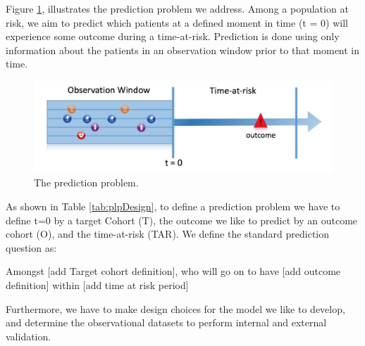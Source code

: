 \documentclass[11pt]{book}
\theoremstyle{definition}
\theoremstyle{definition}
\theoremstyle{definition}
\theoremstyle{remark}
\let\BeginKnitrBlock\begin \let\EndKnitrBlock\end
\begin{document}
Figure \ref{fig:figure1}, illustrates the prediction problem we address. Among a population at risk, we aim to predict which patients at a defined moment in time (t = 0) will experience some outcome during a time-at-risk. Prediction is done using only information about the patients in an observation window prior to that moment in time.

\begin{figure}
\includegraphics[width=1\linewidth]{images/PatientLevelPrediction/Figure1} \caption{The prediction problem.}\label{fig:figure1}
\end{figure}

As shown in Table \ref{tab:plpDesign}, to define a prediction problem we have to define t=0 by a target Cohort (T), the outcome we like to predict by an outcome cohort (O), and the time-at-risk (TAR). We define the standard prediction question as:

\BeginKnitrBlock{rmdimportant}
Amongst {[}add Target cohort definition{]}, who will go on to have {[}add outcome definition{]} within {[}add time at risk period{]}
\EndKnitrBlock{rmdimportant}

Furthermore, we have to make design choices for the model we like to develop, and determine the observational datasets to perform internal and external validation.
\end{document}
